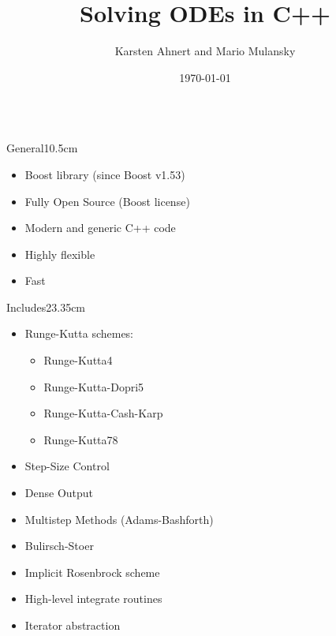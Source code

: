 \documentclass[final,hyperref={pdfpagelabels=false}]{beamer}
\title{Solving ODEs in C++}
\author{Karsten Ahnert and Mario Mulansky}
\institute[Uni Potsdam]{Institute of Physics and Astronomy, University of Potsdam}
\date{\today}
\begin{document}
  \begin{frame}[fragile]{} 

\vspace{-2cm}

\begin{columns}[t]
  \begin{column}{0.32\linewidth}
    \begin{blockwh}{General}{10.5cm}
      \begin{itemize}
	\item Boost library (since Boost v1.53)
	\item Fully Open Source (Boost license)
	\item Modern and generic C++ code
	\item Highly flexible
	\item Fast
      \end{itemize}
    \end{blockwh}
    
    \vspace{1cm}
    
    \begin{blockwh}{Includes}{23.35cm}
      \begin{itemize}
	\item Runge-Kutta schemes:
	\begin{itemize}
	  \item Runge-Kutta4
	  \item Runge-Kutta-Dopri5
	  \item Runge-Kutta-Cash-Karp
	  \item Runge-Kutta78
	\end{itemize}
	\item Step-Size Control
	\item Dense Output
	\item Multistep Methods (Adams-Bashforth)
	\item Bulirsch-Stoer
	\item Implicit Rosenbrock scheme
      \end{itemize}
      \vspace{1em}
      \begin{itemize}
       \item High-level integrate routines
       \item Iterator abstraction
      \end{itemize}

    \end{blockwh}
  \end{column}


\end{columns}
\end{frame}
\end{document}
